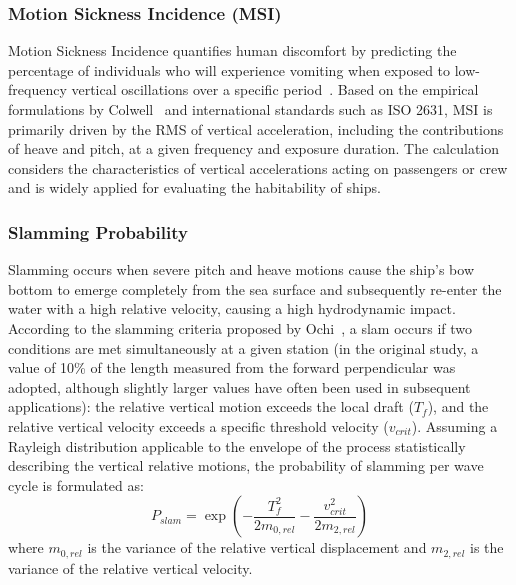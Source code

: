 \documentclass[final,5p,times,twocolumn,numbers]{elsarticle}
\begin{document}
\subsubsection{Motion Sickness Incidence (MSI)}
Motion Sickness Incidence quantifies human discomfort by predicting the percentage of individuals who will experience vomiting when exposed to low-frequency vertical oscillations over a specific period~\cite{ohanlon1974}. Based on the empirical formulations by Colwell~\cite{colwell1989} and international standards such as ISO 2631, MSI is primarily driven by the RMS of vertical acceleration, including the contributions of heave and pitch, at a given frequency and exposure duration. The calculation considers the characteristics of vertical accelerations acting on passengers or crew and is widely applied for evaluating the habitability of ships.

\subsubsection{Slamming Probability}
Slamming occurs when severe pitch and heave motions cause the ship's bow bottom to emerge completely from the sea surface and subsequently re-enter the water with a high relative velocity, causing a high hydrodynamic impact. According to the slamming criteria proposed by Ochi~\cite{ochi1964,ochi1973}, a slam occurs if two conditions are met simultaneously at a given station (in the original study, a value of 10\% of the length measured from the forward perpendicular was adopted, although slightly larger values have often been used in subsequent applications): the relative vertical motion exceeds the local draft ($T_f$), and the relative vertical velocity exceeds a specific threshold velocity ($v_{crit}$). Assuming a Rayleigh distribution applicable to the envelope of the process statistically describing the vertical relative motions, the probability of slamming per wave cycle is formulated as:
\begin{equation}
P_{slam} = \exp\left( - \frac{T_f^{2}}{2m_{0,rel}} - \frac{v_{crit}^{2}}{2m_{2,rel}} \right)
\end{equation}
where $m_{0,rel}$ is the variance of the relative vertical displacement and $m_{2,rel}$ is the variance of the relative vertical velocity.
\end{document}
